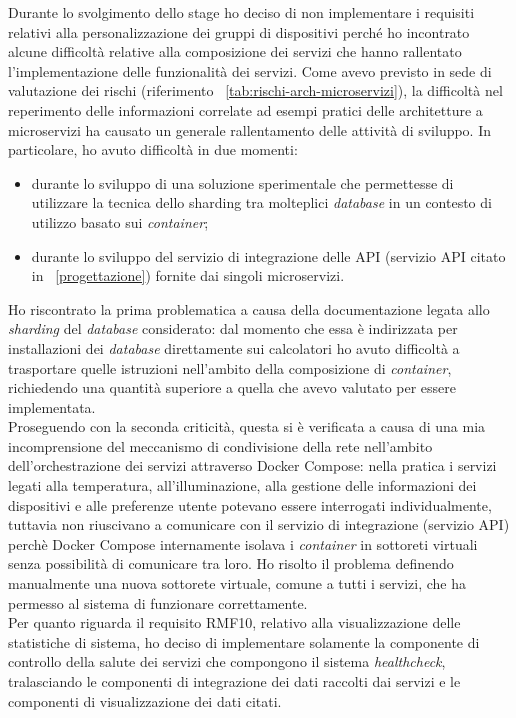 Durante lo svolgimento dello stage ho deciso di non implementare i requisiti relativi alla personalizzazione dei gruppi di dispositivi perché ho incontrato alcune difficoltà relative alla composizione dei servizi che hanno rallentato l'implementazione delle funzionalità dei servizi. Come avevo previsto in sede di valutazione dei rischi (riferimento ~\ref{tab:rischi-arch-microservizi}), la difficoltà nel reperimento delle informazioni correlate ad esempi pratici delle architetture a microservizi ha causato un generale rallentamento delle attività di sviluppo.
In particolare, ho avuto difficoltà in due momenti:
\begin{itemize}[nosep]
  \item durante lo sviluppo di una soluzione sperimentale che permettesse di utilizzare la tecnica dello \gls{sharding} tra molteplici \emph{database} in un contesto di utilizzo basato sui \emph{container};
  \item durante lo sviluppo del servizio di integrazione delle API (servizio API citato in ~\ref{progettazione}) fornite dai singoli microservizi.
\end{itemize}
Ho riscontrato la prima problematica a causa della documentazione legata allo \emph{sharding} del \emph{database} considerato: dal momento che essa è indirizzata per installazioni dei \emph{database} direttamente sui calcolatori ho avuto difficoltà a trasportare quelle istruzioni nell'ambito della composizione di \emph{container}, richiedendo una quantità superiore a quella che avevo valutato per essere implementata.\\
Proseguendo con la seconda criticità, questa si è verificata a causa di una mia incomprensione del meccanismo di condivisione della rete nell'ambito dell'orchestrazione dei servizi attraverso Docker Compose: nella pratica i servizi legati alla temperatura, all'illuminazione, alla gestione delle informazioni dei dispositivi e alle preferenze utente potevano essere interrogati individualmente, tuttavia non riuscivano a comunicare con il servizio di integrazione (servizio API) perchè Docker Compose internamente isolava i \emph{container} in sottoreti virtuali senza possibilità di comunicare tra loro. Ho risolto il problema definendo manualmente una nuova sottorete virtuale, comune a tutti i servizi, che ha permesso al sistema di funzionare correttamente.\\
Per quanto riguarda il requisito RMF10, relativo alla visualizzazione delle statistiche di sistema, ho deciso di implementare solamente la componente di controllo della salute dei servizi che compongono il sistema \emph{healthcheck}, tralasciando le componenti di integrazione dei dati raccolti dai servizi e le componenti di visualizzazione dei dati citati.\\
